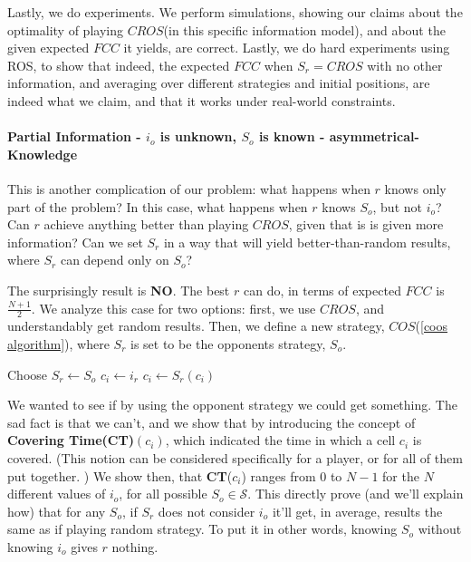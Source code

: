 \documentclass[a4paper,english,10pt]{article}
\newcommand\rob{\ensuremath{r}\xspace}
\newcommand\opp{\ensuremath{o}\xspace}
\newcommand{\fcc}{\ensuremath{FCC}\xspace}
\newcommand{\cros}{\ensuremath{CROS}\xspace}
\newcommand{\coos}{\ensuremath{COS}\xspace}
\begin{document}
Lastly, we do experiments. We perform simulations, showing our claims about the optimality of playing \cros (in this specific information model), and about the given expected \fcc it yields, are correct. 
Lastly, we do hard experiments using ROS, to show that indeed, the expected \fcc when $S_\rob=\cros$ with no other information, and averaging over different strategies and initial positions, are indeed what we claim, and that it works under real-world constraints.

\paragraph{Partial Information - $i_\opp$ is unknown, $S_\opp$ is known - asymmetrical-Knowledge} 
This is another complication of our problem: what happens when \rob knows only part of the problem? In this case, what happens when \rob knows $S_\opp$, but not $i_\opp$? Can \rob achieve anything better than playing \cros, given that is is given more information? Can we set $S_\rob$ in a way that will yield better-than-random results, where $S_\rob$ can depend only on $S_\opp$?

The surprisingly result is \textbf{NO}. The best \rob can do, in terms of expected \fcc is $\frac{N+1}{2}$. 
We analyze this case for two options: first, we use \cros, and understandably get random results.
Then, we define a new strategy, \coos(\ref{coos algorithm}), where $S_\rob$ is set to be the opponents strategy, $S_\opp$. 
\begin{algorithm}
\begin{algorithmic}
	\STATE Choose $S_\rob \leftarrow S_\opp$
    \STATE $c_i \leftarrow i_\rob$
    \LOOP
    	\STATE $c_i \leftarrow S_\rob(c_i)$
    \ENDLOOP
  
\end{algorithmic}
\caption{\coos\label{coos algorithm}}
\end{algorithm}

We wanted to see if by using the opponent strategy we could get something. The sad fact is that we can't, and we show that by introducing the concept of \textbf{Covering Time(CT)}$(c_i)$, which indicated the time in which a cell $c_i$ is covered. (This notion can be considered specifically for a player, or for all of them put together. ) We show then, that \textbf{CT}($c_i$) ranges from $0$ to $N-1$ for the $N$ different values of $i_\opp$, for all possible $S_\opp \in \mathcal{S}$. This directly prove (and we'll explain how) that for any $S_\opp$, if $S_\rob$ does not consider $i_\opp$ it'll get, in average, results the same as if playing random strategy.
To put it in other words, knowing $S_\opp$ without knowing $i_\opp$ gives \rob nothing.
\end{document}
